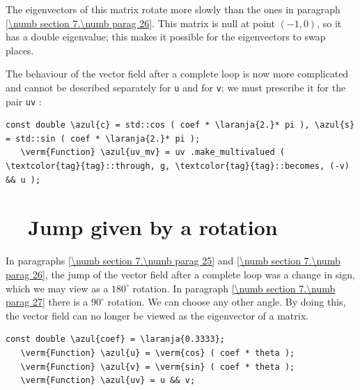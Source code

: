 The eigenvectors of this matrix rotate more slowly than the ones in paragraph
\ref{\numb section 7.\numb parag 26}.
This matrix is null at point $ (-1,0) $, so it has a double eigenvalue;
this makes it possible for the eigenvectors to swap places.

The behaviour of the vector field after a complete loop is now more complicated and cannot
be described separately for {\small\tt u} and for {\small\tt v}; we must prescribe it
for the pair {\small\tt uv} :

\begin{Verbatim}[commandchars=\\\{\},formatcom=\small\tt,frame=single,
   label=parag-\ref{\numb section 7.\numb parag 27}.cpp,rulecolor=\color{moldura},
   baselinestretch=0.94,framesep=2mm                                              ]
   const double \azul{c} = std::cos ( coef * \laranja{2.}* pi ), \azul{s} = std::sin ( coef * \laranja{2.}* pi );
   \verm{Function} \azul{uv_mv} = uv .make_multivalued ( \textcolor{tag}{tag}::through, g, \textcolor{tag}{tag}::becomes, (-v) && u );
\end{Verbatim}


\section{~~Jump given by a rotation}  \label{\numb section 7.\numb parag 28}

In paragraphs \ref{\numb section 7.\numb parag 25} and \ref{\numb section 7.\numb parag 26},
the jump of the vector field after a complete loop was a change in sign,
which we may view as a $ 180^\circ $ rotation.
In paragraph \ref{\numb section 7.\numb parag 27} there is a $ 90^\circ $ rotation.
We can choose any other angle.
By doing this, the vector field can no longer be viewed as the eigenvector of a matrix.

\begin{Verbatim}[commandchars=\\\{\},formatcom=\small\tt,frame=single,
   label=parag-\ref{\numb section 7.\numb parag 28}.cpp,rulecolor=\color{moldura},
   baselinestretch=0.94,framesep=2mm                                              ]
   const double \azul{coef} = \laranja{0.3333};
   \verm{Function} \azul{u} = \verm{cos} ( coef * theta );
   \verm{Function} \azul{v} = \verm{sin} ( coef * theta );
   \verm{Function} \azul{uv} = u && v;
\end{Verbatim}

